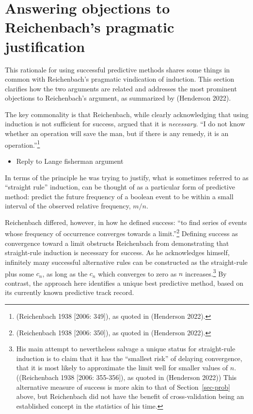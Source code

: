 \documentclass[
  letterpaper,
  DIV=11,
  numbers=noendperiod]{scrartcl}
\providecommand{\tightlist}{%
  \setlength{\itemsep}{0pt}\setlength{\parskip}{0pt}}
\theoremstyle{definition}
\theoremstyle{remark}
\begin{document}
\section{Answering objections to Reichenbach's pragmatic
justification}\label{sec-induct}

This rationale for using successful predictive methods shares some
things in common with Reichenbach's pragmatic vindication of induction.
This section clarifies how the two arguments are related and addresses
the most prominent objections to Reichenbach's argument, as summarized
by (Henderson 2022).

The key commonality is that Reichenbach, while clearly acknowledging
that using induction is not sufficient for success, argued that it is
\emph{necessary}. ``I do not know whether an operation will save the
man, but if there is any remedy, it is an operation.''\footnote{(Reichenbach
  1938 {[}2006: 349{]}), as quoted in (Henderson 2022).}

\begin{itemize}
\tightlist
\item
  Reply to Lange fisherman argument
\end{itemize}

In terms of the principle he was trying to justify, what is sometimes
referred to as ``straight rule'' induction, can be thought of as a
particular form of predictive method: predict the future frequency of a
boolean event to be within a small interval of the observed relative
frequency, \(m/n\).

Reichenbach differed, however, in how he defined success: ``to find
series of events whose frequency of occurrence converges towards a
limit.''\footnote{(Reichenbach 1938 {[}2006: 350{]}), as quoted in
  (Henderson 2022).} Defining success as convergence toward a limit
obstructs Reichenbach from demonstrating that straight-rule induction is
necessary for success. As he acknowledges himself, infinitely many
successful alternative rules can be constructed as the straight-rule
plus some \(c_n\), as long as the \(c_n\) which converges to zero as
\(n\) increases.\footnote{His main attempt to nevertheless salvage a
  unique status for straight-rule induction is to claim that it has the
  ``smallest risk'' of delaying convergence, that it is most likely to
  approximate the limit well for smaller values of \(n\).((Reichenbach
  1938 {[}2006: 355-356{]}), as quoted in (Henderson 2022)) This
  alternative measure of success is more akin to that of
  Section~\ref{sec-prob} above, but Reichenbach did not have the benefit
  of cross-validation being an established concept in the statistics of
  his time.} By contrast, the approach here identifies a unique best
predictive method, based on its currently known predictive track record.
\end{document}
